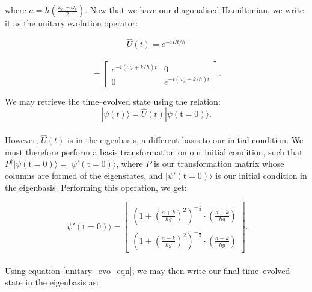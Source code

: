 \documentclass[11pt]{article}
\begin{document}
where $a = \hbar\left(\frac{\omega_a - \omega_c}{2}\right)$. Now that we have our diagonalised Hamiltonian, we write it as the unitary evolution operator:

\begin{equation*}
    \hat{U}(t) = e^{-i\hat{H}t/\hbar}
\end{equation*}
\\ 
\begin{equation*}
    = 
    \begin{bmatrix}
        e^{-i(\omega_c + k/\hbar)t} & 0 \\
        0 & e^{-i(\omega_c - k/\hbar)t}
    \end{bmatrix}.
\end{equation*}

We may retrieve the time--evolved state using the relation:
\begin{equation} \label{unitary_evo_eqn}
    |\psi(t)\rangle = \hat{U}(t)|\psi(\text{t}=0)\rangle.
\end{equation}
\\
However, $\hat{U}(t)$ is in the eigenbasis, a different basis to our initial condition. We must therefore perform a basis transformation on our initial condition, such that $P^\dagger|\psi(\text{t} = 0)\rangle = |\psi'(\text{t} = 0)\rangle$, where $P$ is our transformation matrix whose columns are formed of the eigenstates, and $|\psi'(\text{t} = 0)\rangle$ is our initial condition in the eigenbasis. Performing this operation, we get:

\begin{equation*}
    |\psi'(\text{t} = 0)\rangle = 
    \begin{bmatrix}
        \left(1 + \left(\frac{a + k}{\hbar g}\right)^2\right)^{-\frac{1}{2}}\cdot\left(\frac{a + k}{\hbar g}\right) \\
        \left(1 + \left(\frac{a - k}{\hbar g}\right)^2\right)^{-\frac{1}{2}}\cdot\left(\frac{a - k}{\hbar g}\right)
    \end{bmatrix}.
\end{equation*}
\\
Using equation \eqref{unitary_evo_eqn}, we may then write our final time--evolved state in the eigenbasis as:
\end{document}
